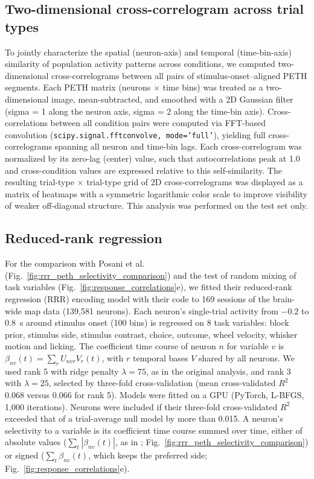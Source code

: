 \documentclass[10pt,lineno]{elife}
\begin{document}
\subsection{Two-dimensional cross-correlogram across trial types}
To jointly characterize the spatial (neuron-axis) and temporal (time-bin-axis) similarity of population activity patterns across conditions, we computed two-dimensional cross-correlograms between all pairs of stimulus-onset–aligned PETH segments. Each PETH matrix (neurons $\times$ time bins) was treated as a two-dimensional image, mean-subtracted, and smoothed with a 2D Gaussian filter (sigma = 1 along the neuron axis, sigma = 2 along the time-bin axis). Cross-correlations between all condition pairs were computed via FFT-based convolution (\texttt{scipy.signal.fftconvolve, mode='full'}), yielding full cross-correlograms spanning all neuron and time-bin lags. Each cross-correlogram was normalized by its zero-lag (center) value, such that autocorrelations peak at 1.0 and cross-condition values are expressed relative to this self-similarity. The resulting trial-type $\times$ trial-type grid of 2D cross-correlograms was displayed as a matrix of heatmaps with a symmetric logarithmic color scale to improve visibility of weaker off-diagonal structure. This analysis was performed on the test set only.

\fi

\subsection{Reduced-rank regression}
For the comparison with Posani et al.\ \cite{posani2026rarely} (Fig.~\ref{fig:rrr_peth_selectivity_comparison}) and the test of random mixing of task variables (Fig.~\ref{fig:response_correlations}e), we fitted their reduced-rank regression (RRR) encoding model with their code to 169 sessions of the brain-wide map data (139,581 neurons). Each neuron's single-trial activity from $-0.2$ to 0.8~s around stimulus onset (100 bins) is regressed on 8 task variables: block prior, stimulus side, stimulus contrast, choice, outcome, wheel velocity, whisker motion and licking. The coefficient time course of neuron $n$ for variable $v$ is $\beta_{nv}(t)=\sum_r U_{nvr}V_r(t)$, with $r$ temporal bases $V$ shared by all neurons. We used rank 5 with ridge penalty $\lambda=75$, as in the original analysis, and rank 3 with $\lambda=25$, selected by three-fold cross-validation (mean cross-validated $R^2$ 0.068 versus 0.066 for rank 5). Models were fitted on a GPU (PyTorch, L-BFGS, 1,000 iterations). Neurons were included if their three-fold cross-validated $R^2$ exceeded that of a trial-average null model by more than 0.015. A neuron's selectivity to a variable is its coefficient time course summed over time, either of absolute values ($\sum_t|\beta_{nv}(t)|$, as in \cite{posani2026rarely}; Fig.~\ref{fig:rrr_peth_selectivity_comparison}) or signed ($\sum_t\beta_{nv}(t)$, which keeps the preferred side; Fig.~\ref{fig:response_correlations}e).
\end{document}

